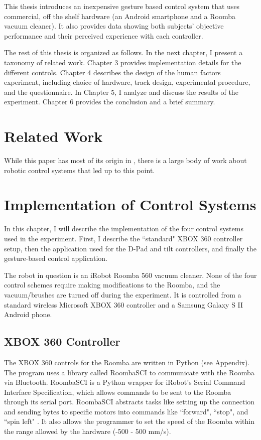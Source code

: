 \documentclass[12pt,a4paper]{report}
\begin{document}
This thesis introduces an inexpensive gesture based control system that uses commercial, off the shelf hardware (an Android smartphone and a Roomba vacuum cleaner). It also provides data showing both subjects' objective performance and their perceived experience with each controller.

The rest of this thesis is organized as follows. In the next chapter, I present a taxonomy of related work. Chapter 3 provides implementation details for the different controls. Chapter 4 describes the design of the human factors experiment, including choice of hardware, track design, experimental procedure, and the questionnaire. In Chapter 5, I analyze and discuss the results of the experiment. Chapter 6 provides the conclusion and a brief summary. 

\chapter{Related Work}
While this paper has most of its origin in \cite{Varcholik_Barber_Nicholson_2008}, there is a large body of work about robotic control systems that led up to this point.

\chapter{Implementation of Control Systems}
In this chapter, I will describe the implementation of the four control systems used in the experiment. First, I describe the ``standard" XBOX 360 controller setup, then the application used for the D-Pad and tilt controllers, and finally the gesture-based control application.

The robot in question is an iRobot Roomba 560 vacuum  cleaner. None of the four control schemes require making modifications to the Roomba, and the vacuum/brushes are turned off during the experiment. It is controlled from a standard wireless Microsoft XBOX 360 controller and a Samsung Galaxy S II Android phone.
\section{XBOX 360 Controller}
The XBOX 360 controls for the Roomba are written in Python (see Appendix). The program uses a library called RoombaSCI to communicate with the Roomba via Bluetooth. RoombaSCI is a Python wrapper for iRobot's Serial Command Interface Specification, which allows commands to be sent to the Roomba through its serial port. RoombaSCI abstracts tasks like setting up the connection and sending bytes to specific motors into commands like ``forward", ``stop", and ``spin left" \cite{RoombaSCI}. It also allows the programmer to set the speed of the Roomba within the range allowed by the hardware (-500 - 500 mm/s). \cite{iRobot}
\end{document}
